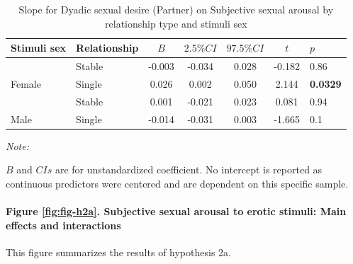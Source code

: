 \documentclass[
  bookmarksnumbered]{article}
\begin{document}
\begin{table}[H]

\caption{\label{tab:tab-m2a-slo-f}Slope for Dyadic sexual desire (Partner) on 
        Subjective sexual arousal by relationship type and stimuli sex}
\centering
\begin{threeparttable}
\begin{tabular}[t]{llccccl}
\toprule
Stimuli sex & Relationship & $B$ & $2.5\% CI$ & $97.5\% CI$ & $t$ & $p$\\
\midrule
 & Stable & -0.003 & -0.034 & 0.028 & -0.182 & 0.86\\
\cmidrule{2-7}
\multirow{-2}{*}{\raggedright\arraybackslash Female} & Single & 0.026 & 0.002 & 0.050 & 2.144 & \textbf{0.0329}\\
\cmidrule{1-7}
 & Stable & 0.001 & -0.021 & 0.023 & 0.081 & 0.94\\
\cmidrule{2-7}
\multirow{-2}{*}{\raggedright\arraybackslash Male} & Single & -0.014 & -0.031 & 0.003 & -1.665 & 0.1\\
\bottomrule
\end{tabular}
\begin{tablenotes}[para]
\item \textit{Note: } 
\item $B$ and $CIs$ are for unstandardized coefficient.
           No intercept is reported as continuous predictors were centered
           and are dependent on this specific sample.
\end{tablenotes}
\end{threeparttable}
\end{table}

\hypertarget{figure-reffigfig-h2a.-subjective-sexual-arousal-to-erotic-stimuli-main-effects-and-interactions}{%
\paragraph{Figure \ref{fig:fig-h2a}. Subjective sexual arousal to erotic stimuli: Main effects and interactions}\label{figure-reffigfig-h2a.-subjective-sexual-arousal-to-erotic-stimuli-main-effects-and-interactions}}

This figure summarizes the results of hypothesis 2a.
\end{document}
